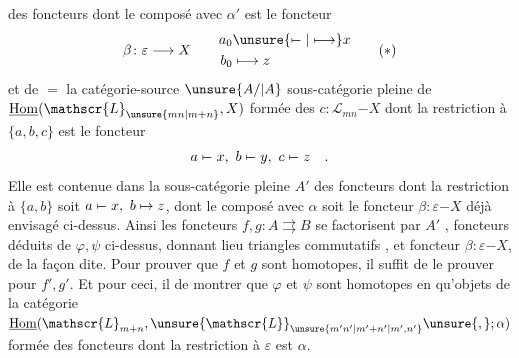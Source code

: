 des foncteurs  dont le composé avec $\alpha'$ est le foncteur
\[
\beta\colon\varepsilon\longrightarrow X\qquad
\begin{aligned}a_0&\unsure{\mathrel{\mapstochar\relbar}|\longmapsto} x\\ b_0&\longmapsto z\end{aligned}
\tag*{$(*)$}
\]
et de $=$ la catégorie-source $\unsure{A/|A}$  
sous-catégorie pleine de $\underline{\mathrm{Hom}}(\mathscr{L}_{\unsure{mn|m+n}},X)$ formée
des $c\colon\mathscr{L}_{mn}\mathord{-}X$ dont la restriction à
$\{a,b,c\}$ est le foncteur
\[
a\mathrel{\mapstochar\relbar}x,\ b\mathrel{\mapstochar\relbar}y,\ c\mathrel{\mapstochar\relbar}z\quad .
\]
Elle est contenue dans la sous-catégorie pleine
$A'$ des foncteurs dont la restriction à $\{a,b\}$ soit
$a\mathrel{\mapstochar\relbar}x,\ b\mapsto z$,  dont le composé avec $\alpha$ soit
le foncteur $\beta\colon\varepsilon\mathord{-}X$ déjà envisagé ci-dessus.
Ainsi les foncteurs $f,g\colon A\rightrightarrows B$ se factorisent
par $A'$
,
foncteurs déduits de $\varphi,\psi$ ci-dessus, donnant
lieu  triangles commutatifs , et  foncteur
 $\beta\colon\varepsilon\mathord{-}X$, de la façon dite. Pour
prouver que $f$ et $g$ sont homotopes, il suffit
de le prouver pour $f',g'$. Et pour ceci, il
  de montrer que $\varphi$ et $\psi$
sont homotopes en  qu'objets de la
catégorie $\underline{\mathrm{Hom}}(\mathscr{L}_{m+n},\unsure{\mathscr{L}}_{\unsure{m'n'|m'+n'|m',n'}}\unsure{,};\alpha)$ formée
des foncteurs dont la restriction à $\varepsilon$ est $\alpha$.
